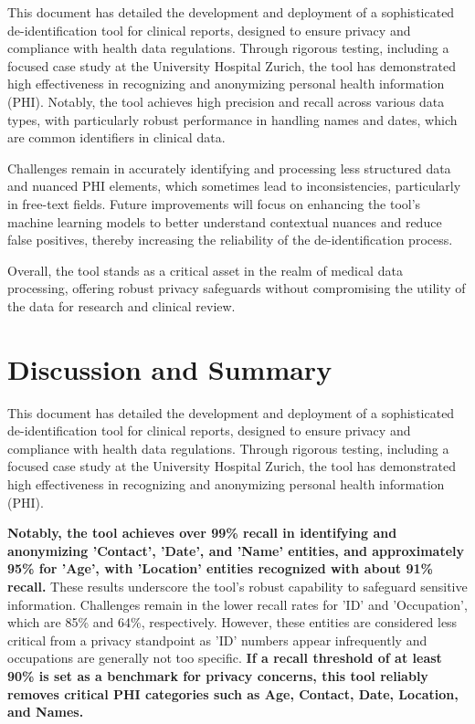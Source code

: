 
This document has detailed the development and deployment of a
sophisticated de-identification tool for clinical reports, designed to
ensure privacy and compliance with health data regulations. Through
rigorous testing, including a focused case study at the University
Hospital Zurich, the tool has demonstrated high effectiveness in
recognizing and anonymizing personal health information
(PHI). Notably, the tool achieves high precision and recall across
various data types, with particularly robust performance in handling
names and dates, which are common identifiers in clinical data.

Challenges remain in accurately identifying and processing less
structured data and nuanced PHI elements, which sometimes lead to
inconsistencies, particularly in free-text fields. Future improvements
will focus on enhancing the tool's machine learning models to better
understand contextual nuances and reduce false positives, thereby
increasing the reliability of the de-identification process.

Overall, the tool stands as a critical asset in the realm of medical
data processing, offering robust privacy safeguards without
compromising the utility of the data for research and clinical review.

\section{Discussion and Summary}

This document has detailed the development and deployment of a
sophisticated de-identification tool for clinical reports, designed to
ensure privacy and compliance with health data regulations. Through
rigorous testing, including a focused case study at the University
Hospital Zurich, the tool has demonstrated high effectiveness in
recognizing and anonymizing personal health information
(PHI).

{\bf Notably, the tool achieves over 99\% recall in identifying and
  anonymizing 'Contact', 'Date', and 'Name' entities, and
  approximately 95\% for 'Age', with 'Location' entities recognized
  with about 91\% recall.} These results underscore the tool's robust
capability to safeguard sensitive information.  Challenges remain in
the lower recall rates for 'ID' and 'Occupation', which are 85\% and
64\%, respectively. However, these entities are considered less
critical from a privacy standpoint as 'ID' numbers appear infrequently
and occupations are generally not too specific. {\bf If a recall
  threshold of at least 90\% is set as a benchmark for privacy
  concerns, this tool reliably removes critical PHI categories such as
  Age, Contact, Date, Location, and Names.}

